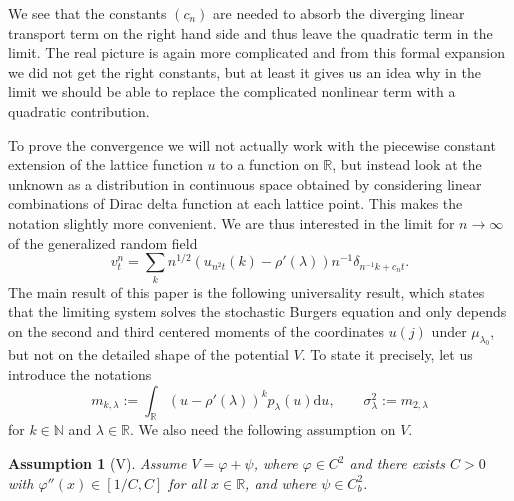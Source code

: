 \documentclass[11pt, a4paper]{article}
\newtheorem*{assumption}{Assumption}
\newcommand{\mathd}{\mathrm{d}}
\newcommand{\R}{\mathbb{R}}
\newcommand{\N}{\mathbb{N}}
\newcommand{\1}{\mathbf{1}}
\begin{document}
We see that the constants $(c_n)$ are needed to absorb the diverging linear transport term on the
right hand side and thus leave the quadratic term in the limit. The real picture is again more complicated and from this
formal expansion we did not get the right constants, but at least it gives us
an idea why in the limit we should be able to replace the complicated
nonlinear term with a quadratic contribution.

To prove the convergence we will not actually work with the piecewise constant extension of the
lattice function $u$ to a function on $\mathbb{R}$, but instead look at the unknown as a distribution in continuous space obtained by considering linear combinations of Dirac delta function at each lattice point. This  makes the notation
slightly more convenient. We are thus interested in the limit for $n
\rightarrow \infty$ of the generalized random field
\begin{equation} \label{eq:vn working def} v^n_t = \sum_k n^{1 / 2} (u_{n^2 t} (k) - \rho'
   (\lambda)) n^{- 1} \delta_{n^{- 1} k + c_n t} . \end{equation}
The main result of this paper is  the following universality result, which states that the limiting system solves the stochastic Burgers equation and only depends on the second and third centered moments of the coordinates $u(j)$ under $\mu_{\lambda_0}$, but not on the detailed shape of the potential $V$. To state it precisely, let us introduce the notations
\[
   m_{k,\lambda} := \int_\R (u - \rho'(\lambda))^k p_\lambda(u) \mathd u, \qquad \sigma^2_\lambda := m_{2,\lambda}
\]
for $k \in \N$ and $\lambda \in \R$. We also need the following assumption on $V$.

\begin{assumption}[V]\label{ass:v}
  Assume $V = \varphi + \psi$, where $\varphi \in C^2$ and there exists $C>0$ with $\varphi''(x) \in [1/C,C]$ for all $x \in \R$, and where $\psi \in C^2_b$.
\end{assumption}
\newcommand{\assumptionV}{\hyperref[ass:v]{Assumption (V)}\xspace}
\end{document}
